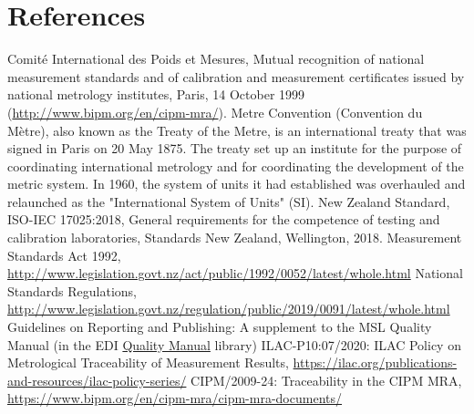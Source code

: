 \section{References}

\begingroup
\renewcommand{\section}[2]{}%

\begin{thebibliography}{9}
 Comit\'e International des Poids et Mesures, Mutual recognition of national measurement standards and of calibration and measurement certificates issued by national metrology institutes, Paris, 14 October 1999 (\url{http://www.bipm.org/en/cipm-mra/}).
 Metre Convention (Convention du M\`etre), also known as the Treaty of the Metre, is an international treaty that was signed in Paris on 20 May 1875. The treaty set up an institute for the purpose of coordinating international metrology and for coordinating the development of the metric system. In 1960, the system of units it had established was overhauled and relaunched as the "International System of Units" (SI).
 New Zealand Standard, ISO-IEC 17025:2018, General requirements for the competence of testing and calibration laboratories, Standards New Zealand, Wellington, 2018.
 {Measurement Standards Act 1992}, \url{http://www.legislation.govt.nz/act/public/1992/0052/latest/whole.html}
 {National Standards Regulations}, \url{http://www.legislation.govt.nz/regulation/public/2019/0091/latest/whole.html}
 Guidelines on Reporting and Publishing: A supplement to the MSL Quality Manual (in the EDI \href{https://edi.callaghaninnovation.govt.nz/ws/msl/QMS/QM?Web=1}{Quality Manual} library)
 {ILAC-P10:07/2020: ILAC Policy on Metrological Traceability of Measurement Results}, \url{https://ilac.org/publications-and-resources/ilac-policy-series/}
 {CIPM/2009-24: Traceability in the CIPM MRA}, \url{https://www.bipm.org/en/cipm-mra/cipm-mra-documents/}
\end{thebibliography}

\endgroup